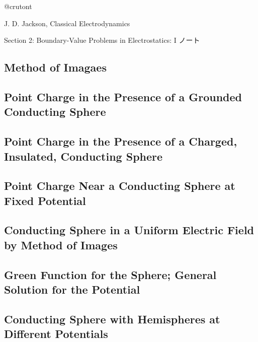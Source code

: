 
\pagestyle{fancy}  
\fancyhead[L]{}  
\fancyhead[C]{}  
\fancyhead[R]{\textbf{\thepage}}  
\fancyfoot{}

\renewcommand{\contentsname}{Contents}

  
\begin{flushright}  
  @crutont
\end{flushright}
\begin{screen}
  \centering
  J. D. Jackson, Classical Electrodynamics

  Section 2: Boundary-Value Problems in Electrostatics: I ノート
\end{screen}

\setcounter{section}{2}
\tableofcontents
\hrulefill

\subsection{Method of Imagaes}

\subsection{Point Charge in the Presence of a Grounded Conducting Sphere}

\subsection{Point Charge in the Presence of a Charged, Insulated, Conducting Sphere}

\subsection{Point Charge Near a Conducting Sphere at Fixed Potential}

\subsection{Conducting Sphere in a Uniform Electric Field by Method of Images}

\subsection{Green Function for the Sphere; General Solution for the Potential}

\subsection{Conducting Sphere with Hemispheres at Different Potentials}

